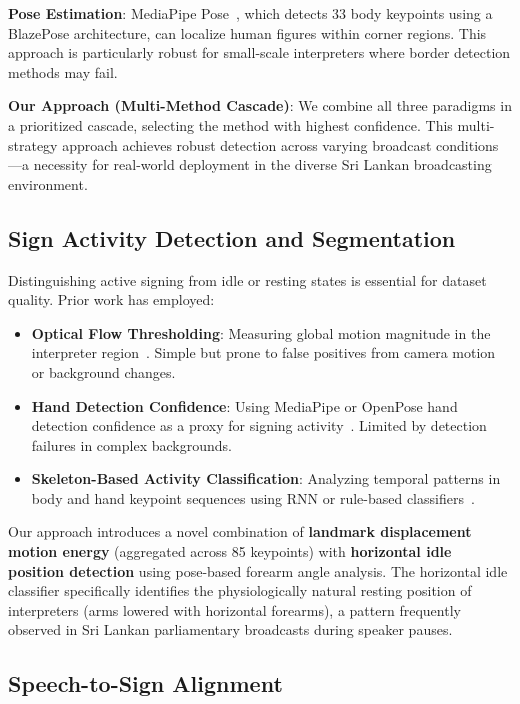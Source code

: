 \documentclass[journal]{IEEEtran}
\begin{document}
\textbf{Pose Estimation}: MediaPipe Pose~\cite{bazarevsky2020blazepose}, which detects 33 body keypoints using a BlazePose architecture, can localize human figures within corner regions. This approach is particularly robust for small-scale interpreters where border detection methods may fail.

\textbf{Our Approach (Multi-Method Cascade)}: We combine all three paradigms in a prioritized cascade, selecting the method with highest confidence. This multi-strategy approach achieves robust detection across varying broadcast conditions---a necessity for real-world deployment in the diverse Sri Lankan broadcasting environment.

\subsection{Sign Activity Detection and Segmentation}

Distinguishing active signing from idle or resting states is essential for dataset quality. Prior work has employed:

\begin{itemize}
    \item \textbf{Optical Flow Thresholding}: Measuring global motion magnitude in the interpreter region~\cite{neidle2001signstream}. Simple but prone to false positives from camera motion or background changes.
    \item \textbf{Hand Detection Confidence}: Using MediaPipe or OpenPose hand detection confidence as a proxy for signing activity~\cite{zhang2020mediapipe}. Limited by detection failures in complex backgrounds.
    \item \textbf{Skeleton-Based Activity Classification}: Analyzing temporal patterns in body and hand keypoint sequences using RNN or rule-based classifiers~\cite{cao2021openpose}.
\end{itemize}

Our approach introduces a novel combination of \textbf{landmark displacement motion energy} (aggregated across 85 keypoints) with \textbf{horizontal idle position detection} using pose-based forearm angle analysis. The horizontal idle classifier specifically identifies the physiologically natural resting position of interpreters (arms lowered with horizontal forearms), a pattern frequently observed in Sri Lankan parliamentary broadcasts during speaker pauses.

\subsection{Speech-to-Sign Alignment}
\end{document}
